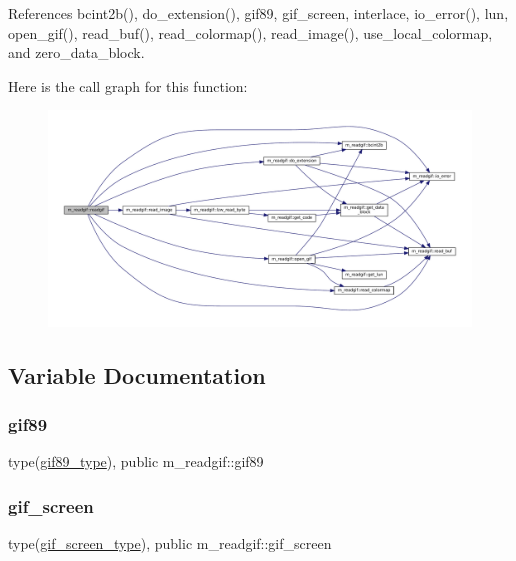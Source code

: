References bcint2b(), do\+\_\+extension(), gif89, gif\+\_\+screen, interlace, io\+\_\+error(), lun, open\+\_\+gif(), read\+\_\+buf(), read\+\_\+colormap(), read\+\_\+image(), use\+\_\+local\+\_\+colormap, and zero\+\_\+data\+\_\+block.

Here is the call graph for this function\+:
\nopagebreak
\begin{figure}[H]
\begin{center}
\leavevmode
\includegraphics[width=350pt]{namespacem__readgif_a775e2da2a9f54ec308e87a339a393ed6_cgraph}
\end{center}
\end{figure}


\subsection{Variable Documentation}
\mbox{\label{namespacem__readgif_a1d5a3f008ce6a2b13029a0977dba1aa1}} 
\subsubsection{\texorpdfstring{gif89}{gif89}}
{\footnotesize\ttfamily type(\mbox{\hyperlink{structm__readgif_1_1gif89__type}{gif89\+\_\+type}}), public m\+\_\+readgif\+::gif89}

\mbox{\label{namespacem__readgif_a6253fc469a2750e1d59bc498bca3d6eb}} 
\subsubsection{\texorpdfstring{gif\+\_\+screen}{gif\_screen}}
{\footnotesize\ttfamily type(\mbox{\hyperlink{structm__readgif_1_1gif__screen__type}{gif\+\_\+screen\+\_\+type}}), public m\+\_\+readgif\+::gif\+\_\+screen}

